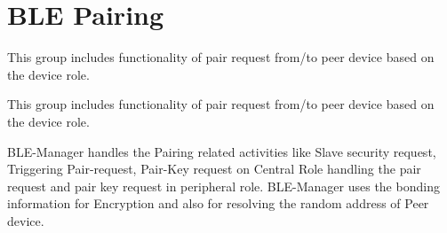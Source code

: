 \hypertarget{group__ble__manager__pairing}{}\section{B\+LE Pairing}
\label{group__ble__manager__pairing}


This group includes functionality of pair request from/to peer device based on the device role.  


This group includes functionality of pair request from/to peer device based on the device role. 

B\+L\+E-\/\+Manager handles the Pairing related activities like Slave security request, Triggering Pair-\/request, Pair-\/\+Key request on Central Role handling the pair request and pair key request in peripheral role. B\+L\+E-\/\+Manager uses the bonding information for Encryption and also for resolving the random address of Peer device.